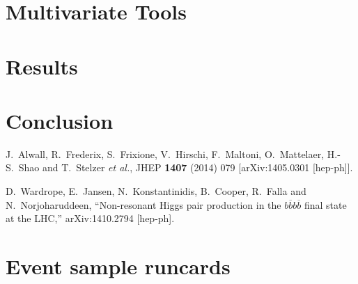 \documentclass[12pt]{article}
\def\Acknowledgements{\bigskip  \bigskip \begin{center} \begin{large}
             \bf ACKNOWLEDGEMENTS \end{large}\end{center}}
\begin{document}
\section{Multivariate Tools}

\section{Results}

\section{Conclusion}



\begin{thebibliography}{1}

  J.~Alwall, R.~Frederix, S.~Frixione, V.~Hirschi, F.~Maltoni, O.~Mattelaer, H.-S.~Shao and T.~Stelzer {\it et al.},
  JHEP {\bf 1407} (2014) 079
  [arXiv:1405.0301 [hep-ph]].

  D.~Wardrope, E.~Jansen, N.~Konstantinidis, B.~Cooper, R.~Falla and N.~Norjoharuddeen,
  ``Non-resonant Higgs pair production in the $b\overline{b}b\overline{b}$ final state at the LHC,''
  arXiv:1410.2794 [hep-ph].


  \end{thebibliography}


\clearpage
\appendix
\section{Event sample runcards}
\label{app:runcards}
\end{document}
